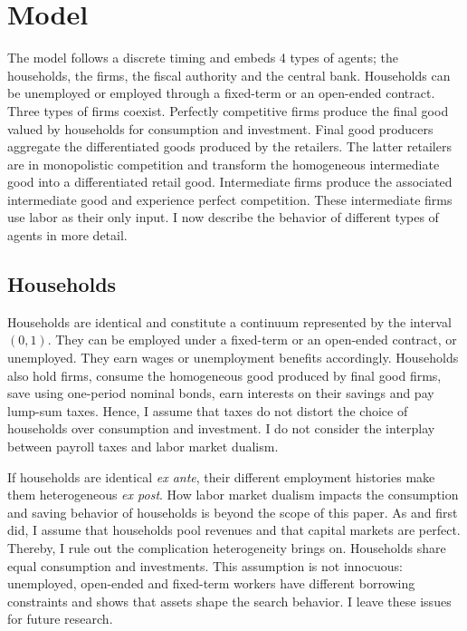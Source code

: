 \section{Model}

The model follows a discrete timing and embeds 4 types of agents; the households, the firms, the fiscal authority and the central bank. Households can be unemployed or employed through a fixed-term or an open-ended contract. Three types of firms coexist. Perfectly competitive firms produce the final good valued by households for consumption and investment. Final good producers aggregate the differentiated goods produced by the retailers. The latter retailers are in monopolistic competition and transform the homogeneous intermediate good into a differentiated retail good. Intermediate firms produce the associated intermediate good and experience perfect competition. These intermediate firms use labor as their only input. I now describe the behavior of different types of agents in more detail.

\subsection{Households}

Households are identical and constitute a continuum represented  by the interval $(0,1)$. They can be employed under a fixed-term or an open-ended contract, or unemployed. They earn wages or unemployment benefits accordingly. Households also hold firms, consume the homogeneous good produced by final good firms, save using one-period nominal bonds, earn interests on their savings and pay lump-sum taxes. Hence, I assume that taxes do not distort the choice of households over consumption and investment. I do not consider the interplay between payroll taxes and labor market dualism.

If households are identical \emph{ex ante}, their different employment histories make them heterogeneous \emph{ex post}. How labor market dualism impacts the consumption and saving behavior of households is beyond the scope of this paper. As \citet{merz1995search} and \citet{andolfatto1996business} first did, I assume that households pool revenues and that capital markets are perfect. Thereby, I rule out the complication heterogeneity brings on. Households share equal consumption and investments. This assumption is not innocuous: unemployed, open-ended and fixed-term workers have different borrowing constraints and \citet{10.2307/43551457} shows that assets shape the search behavior. I leave these issues for future research. 

